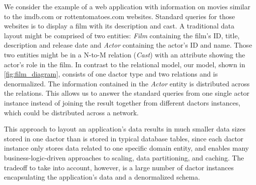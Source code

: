     We consider the example of a web application with information on movies similar to the imdb.com or rottentomatoes.com websites.
    Standard queries for those websites is to display a film with its description and cast.
    A traditional data layout might be comprised of two entities: \textit{Film} containing the film's ID, title, description and release date and \textit{Actor} containing the actor's ID and name.
    Those two entities might be in a N-to-M relation (\textit{Cast}) with an attribute showing the actor's role in the film.
    In contrast to the relational model, our model, shown in \cref{fig:film_diagram}, consists of one \gls{dactor} type and two \glspl{relation} and is denormalized.
    The information contained in the \textit{Actor} entity is distributed across the  \glspl{relation}.
    This allows us to answer the standard queries from one single actor instance instead of joining the result together from different \glspl{dactor} instances, which could be distributed across a network.

    This approach to layout an application's data results in much smaller data sizes stored in one \gls{dactor} than is stored in typical database tables, since each \gls{dactor} instance only stores data related to one specific domain entity, and enables many business-logic-driven approaches to scaling, data partitioning, and caching.
    The tradeoff to take into account, however, is a large number of \gls{dactor} instances encapsulating the application's data and a denormalized schema.

